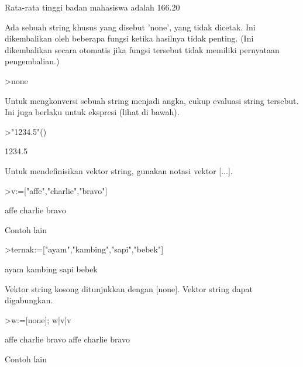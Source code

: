\documentclass[12pt,arial,letterpaper]{book}
\begin{document}
\begin{euleroutput}
  Rata-rata tinggi badan mahasiswa adalah    166.20
\end{euleroutput}
\begin{eulercomment}
Ada sebuah string khusus yang disebut 'none', yang tidak dicetak. Ini
dikembalikan oleh beberapa fungsi ketika hasilnya tidak penting. (Ini
dikembalikan secara otomatis jika fungsi tersebut tidak memiliki
pernyataan pengembalian.)
\end{eulercomment}
\begin{eulerprompt}
>none
\end{eulerprompt}
\begin{eulercomment}
Untuk mengkonversi sebuah string menjadi angka, cukup evaluasi string
tersebut. Ini juga berlaku untuk ekspresi (lihat di bawah).
\end{eulercomment}
\begin{eulerprompt}
>"1234.5"()
\end{eulerprompt}
\begin{euleroutput}
  1234.5
\end{euleroutput}
\begin{eulercomment}
Untuk mendefinisikan vektor string, gunakan notasi vektor [...].
\end{eulercomment}
\begin{eulerprompt}
>v:=["affe","charlie","bravo"]
\end{eulerprompt}
\begin{euleroutput}
  affe
  charlie
  bravo
\end{euleroutput}
\begin{eulercomment}
Contoh lain
\end{eulercomment}
\begin{eulerprompt}
>ternak:=["ayam","kambing","sapi","bebek"]
\end{eulerprompt}
\begin{euleroutput}
  ayam
  kambing
  sapi
  bebek
\end{euleroutput}
\begin{eulercomment}
Vektor string kosong ditunjukkan dengan [none]. Vektor string dapat
digabungkan.
\end{eulercomment}
\begin{eulerprompt}
>w:=[none]; w|v|v
\end{eulerprompt}
\begin{euleroutput}
  affe
  charlie
  bravo
  affe
  charlie
  bravo
\end{euleroutput}
\begin{eulercomment}
Contoh lain
\end{eulercomment}
\end{document}
